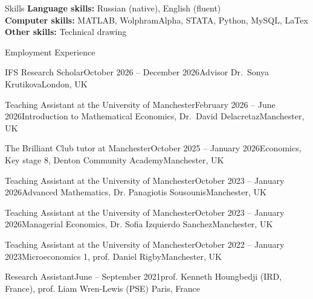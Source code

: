 \documentclass{resume} %
\begin{document}
\clearpage
\begin{rSection}{Skills} 
\textbf{Language skills:} Russian (native), English (fluent)\\
\textbf{Computer skills:} MATLAB, WolphramAlpha, STATA, Python, MySQL, LaTex\\
\textbf{Other skills:} Technical drawing 
\end{rSection}


\begin{rSection}{Employment Experience}

\begin{rSubsection}
    {IFS Research Scholar}{October 2026 -- December 2026}{Advisor Dr.\ Sonya Krutikova}{London, UK}
\end{rSubsection}

\begin{rSubsection}{Teaching Assistant at the University of Manchester}{February 2026 -- June 2026}{Introduction to Mathematical Economics, Dr.\ David Delacretaz}{Manchester, UK}
\end{rSubsection}

\begin{rSubsection}{The Brilliant Club tutor at Manchester}{October 2025 -- January 2026}{Economics, Key stage 8, Denton Community Academy}{Manchester, UK}
\end{rSubsection}

\begin{rSubsection}{Teaching Assistant at the University of Manchester}{October 2023 -- January 2026}{Advanced Mathematics, Dr. Panagiotis Sousounis}{Manchester, UK}
\end{rSubsection}

\begin{rSubsection}{Teaching Assistant at the University of Manchester}{October 2023 -- January 2026}{Managerial Economics, Dr. Sofia Izquierdo Sanchez}{Manchester, UK}
\end{rSubsection}

\begin{rSubsection}{Teaching Assistant at the University of Manchester}{October 2022 -- January 2023}{Microeconomics 1, prof. Daniel Rigby}{Manchester, UK}
\end{rSubsection}

\begin{rSubsection}{Research Assistant}{June -- September 2021}{prof. Kenneth Houngbedji (IRD, France), prof. Liam Wren-Lewis (PSE) }{Paris, France}
\end{rSubsection}


\end{rSection}
\end{document}
